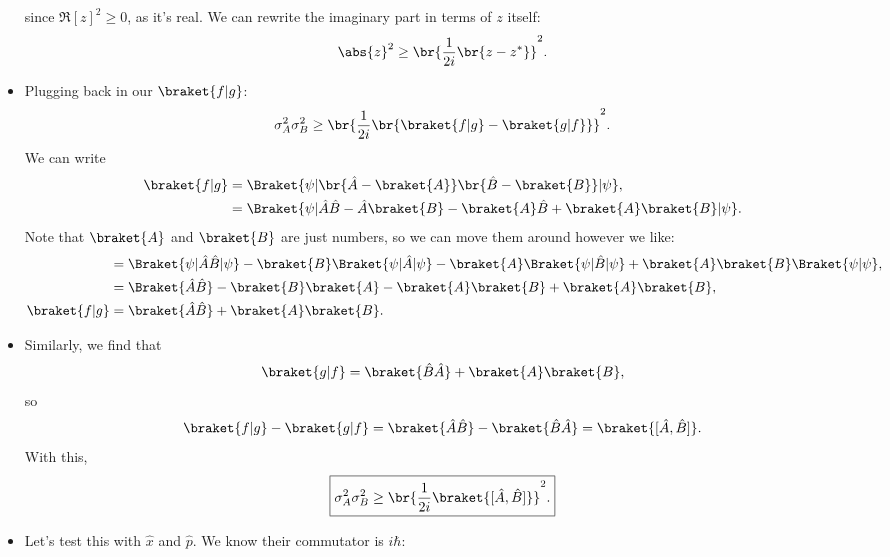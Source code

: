 \begin{itemize}
        since $\mathrm{\Re}[z]^2 \geq 0$, as it's real. We can rewrite the imaginary part in terms of $z$ itself:
        \begin{equation*}
            \abs{z}^2 \geq \br{\frac{1}{2i}\br{z-z^*}}^2.
        \end{equation*}
    \item Plugging back in our $\braket{f|g}$:
        \begin{equation*}
            \sigma_A^2\sigma_B^2 \geq \br{\frac{1}{2i}\br{\braket{f|g} - \braket{g|f}}}^2.
        \end{equation*}
        We can write
        \begin{align*}
            \braket{f|g} &= \Braket{\psi | \br{\hat{A} - \braket{A}}\br{\hat{B} - \braket{B}} | \psi}, \\
            &= \Braket{\psi | \hat{A}\hat{B} - \hat{A}\braket{B} - \braket{A}\hat{B} + \braket{A}\braket{B} | \psi}.
        \end{align*}
        Note that $\braket{A}$ and $\braket{B}$ are just numbers, so we can move them around however we like:
        \begin{align*}
            &= \Braket{\psi | \hat{A}\hat{B} | \psi} - \braket{B}\Braket{\psi | \hat{A} | \psi} - \braket{A}\Braket{\psi | \hat{B} | \psi} + \braket{A}\braket{B}\Braket{\psi|\psi}, \\
            &= \Braket{\hat{A}\hat{B}} - \braket{B}\braket{A} - \braket{A}\braket{B} + \braket{A}\braket{B}, \\
            \braket{f|g} &= \braket{\hat{A}\hat{B}} + \braket{A}\braket{B}.
        \end{align*}
    \item Similarly, we find that 
        \begin{equation*}
            \braket{g|f} = \braket{\hat{B}\hat{A}} + \braket{A}\braket{B},
        \end{equation*}
        so  
        \begin{equation*}
            \braket{f|g} - \braket{g|f} = \braket{\hat{A}\hat{B}} - \braket{\hat{B}\hat{A}} = \braket{[\hat{A},\hat{B}]}.
        \end{equation*}
        With this,
        \begin{equation*}
            \boxed{\sigma_A^2\sigma_B^2 \geq \br{\frac{1}{2i}\braket{[\hat{A},\hat{B}]}}^2.}
        \end{equation*}
    \item Let's test this with $\hat{x}$ and $\hat{p}$. We know their commutator is $i\hbar$:

\end{itemize}
